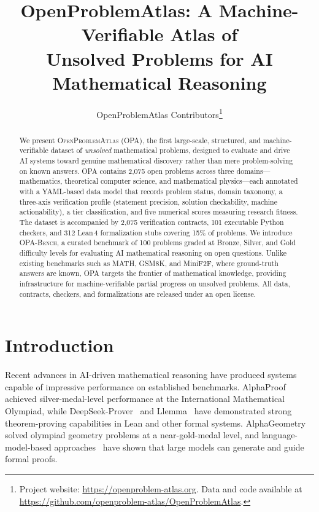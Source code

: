 \documentclass[11pt]{article}
\title{\textbf{OpenProblemAtlas}: A Machine-Verifiable Atlas of \\Unsolved Problems for AI Mathematical Reasoning}
\author{
  OpenProblemAtlas Contributors\thanks{Project website: \url{https://openproblem-atlas.org}. Data and code available at \url{https://github.com/openproblem-atlas/OpenProblemAtlas}.}
}
\date{}
\begin{document}
\maketitle

\begin{abstract}
We present \textsc{OpenProblemAtlas} (OPA), the first large-scale, structured, and machine-verifiable dataset of \emph{unsolved} mathematical problems, designed to evaluate and drive AI systems toward genuine mathematical discovery rather than mere problem-solving on known answers.
OPA contains 2{,}075 open problems across three domains---mathematics, theoretical computer science, and mathematical physics---each annotated with a YAML-based data model that records problem status, domain taxonomy, a three-axis verification profile (statement precision, solution checkability, machine actionability), a tier classification, and five numerical scores measuring research fitness.
The dataset is accompanied by 2{,}075 verification contracts, 101 executable Python checkers, and 312 Lean\,4 formalization stubs covering 15\% of problems.
We introduce \textsc{OPA-Bench}, a curated benchmark of 100 problems graded at Bronze, Silver, and Gold difficulty levels for evaluating AI mathematical reasoning on open questions.
Unlike existing benchmarks such as MATH, GSM8K, and MiniF2F, where ground-truth answers are known, OPA targets the frontier of mathematical knowledge, providing infrastructure for machine-verifiable partial progress on unsolved problems.
All data, contracts, checkers, and formalizations are released under an open license.
\end{abstract}

\section{Introduction}
\label{sec:intro}

Recent advances in AI-driven mathematical reasoning have produced systems capable of impressive performance on established benchmarks.
AlphaProof~\citep{alphaproof2024} achieved silver-medal-level performance at the International Mathematical Olympiad, while DeepSeek-Prover~\citep{xin2024deepseekprover} and Llemma~\citep{azerbayev2024llemma} have demonstrated strong theorem-proving capabilities in Lean and other formal systems.
AlphaGeometry~\citep{trinh2024alphageometry} solved olympiad geometry problems at a near-gold-medal level, and language-model-based approaches~\citep{polu2020gpt,jiang2023draft} have shown that large models can generate and guide formal proofs.
\end{document}
